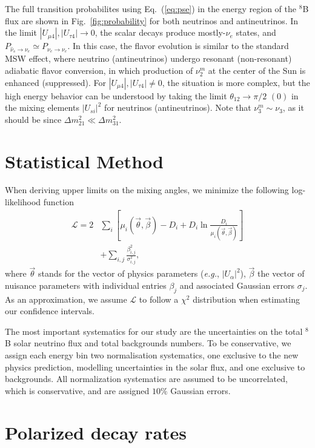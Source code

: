 \documentclass[
reprint,
superscriptaddress,
showpacs,
preprintnumbers,
nofootinbib,
nobibnotes,
amsmath,
amssymb, 
aps,
prd,
floatfix
]{revtex4-1}
\newcommand{\refeq}[1]{Eq.~(\ref{#1})}
\def\eg{\emph{e.g.}}
\begin{document}
The full transition probabilites using \refeq{eq:pse} in the energy region of the $^8$B flux are shown in Fig.~\ref{fig:probability} for both neutrinos and antineutrinos. In the limit $|U_{\mu4}|,|U_{\tau4}|\to0$, the scalar decays produce mostly-$\nu_e$ states, and $P_{\hat{\nu}_s\to\nu_e}\simeq P_{\nu_e\to \nu_e}$. In this case, the flavor evolution is similar to the standard MSW effect, where neutrino (antineutrinos) undergo resonant (non-resonant) adiabatic flavor conversion, in which production of $\nu_2^m$ at the center of the Sun is enhanced (suppressed). For $|U_{\mu4}|,|U_{\tau4}|\neq0$, the situation is more complex, but the high energy behavior can be understood by taking the limit $\theta_{12}\to \pi/2$ $(0)$ in the mixing elements $|U_{si}|^2$ for neutrinos (antineutrinos). Note that $\nu_3^m \sim \nu_3$, as it should be since $\Delta m^2_{21} \ll \Delta m^2_{31}$.

\section{Statistical Method}\label{app:statistics}

When deriving upper limits on the mixing angles, we minimize the following log-likelihood function  
%
\begin{align}
\mathcal{L} = 2 &\sum_{i} \left[ \mu_i (\vec{\theta},\vec{\beta}) - D_i + D_i \ln{\frac{D_i}{\mu_i(\vec{\theta},\vec{\beta})}} \right]
\\\nonumber
&+ \sum_{i,j} \frac{\beta_{i,j}^2}{\sigma_{i,j}^2},
\end{align}
%
where $\vec{\theta}$ stands for the vector of physics parameters (\eg, $|U_{\alpha}|^2$), $\vec{\beta}$ the vector of nuisance parameters with individual entries $\beta_j$ and associated Gaussian errors $\sigma_j$. As an approximation, we assume $\mathcal{L}$ to follow a $\chi^2$ distribution when estimating our confidence intervals. 

The most important systematics for our study are the uncertainties on the total $^8$B solar neutrino flux and total backgrounds numbers. To be conservative, we assign each energy bin two normalisation systematics, one exclusive to the new physics prediction, modelling uncertainties in the solar flux, and one exclusive to backgrounds. All normalization systematics are assumed to be uncorrelated, which is conservative, and are assigned $10\%$ Gaussian errors.

\section{Polarized decay rates}
\end{document}
